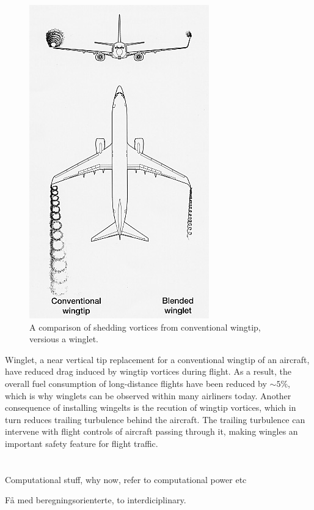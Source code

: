 \begin{figure}
  \vspace{-10pt}
  \begin{center}
  \includegraphics[scale=0.5]{./Fig/winglet.png}
  \end{center}
  \caption{A comparison of shedding vortices from conventional wingtip, versious a winglet.}
\end{figure}
 Winglet, a near vertical tip replacement for a conventional wingtip of an aircraft, have reduced  drag induced by wingtip vortices during flight. As a result, the overall fuel consumption of long-distance flights have been reduced by $\sim 5 \%$, which is why winglets can be observed within many airliners today.  Another consequence of installing wingelts is the recution of wingtip vortices, which in turn reduces trailing turbulence behind the aircraft.  The trailing turbulence can intervene with flight controls of aircraft passing through it, making  wingles an important safety feature for flight traffic. \\ \\ \\


Computational stuff, why now, refer to computational power etc


Få med beregningsorienterte, to interdiciplinary. 